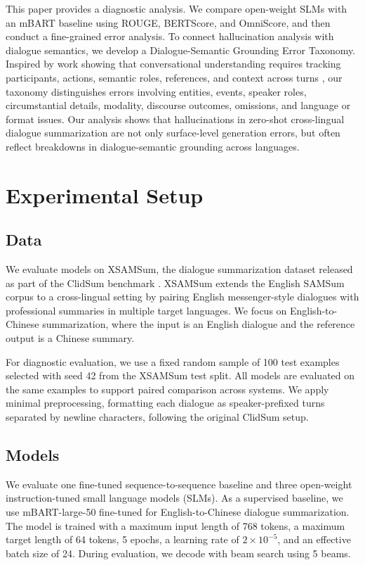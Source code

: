\documentclass[11pt]{article}
\begin{document}
This paper provides a diagnostic analysis. We compare open-weight SLMs with an mBART baseline using ROUGE, BERTScore, and OmniScore, and then conduct a fine-grained error analysis. To connect hallucination analysis with dialogue semantics, we develop a Dialogue-Semantic Grounding Error Taxonomy. Inspired by work showing that conversational understanding requires tracking participants, actions, semantic roles, references, and context across turns \citep{aghajanyan-etal-2020-conversational}, our taxonomy distinguishes errors involving entities, events, speaker roles, circumstantial details, modality, discourse outcomes, omissions, and language or format issues. Our analysis shows that hallucinations in zero-shot cross-lingual dialogue summarization are not only surface-level generation errors, but often reflect breakdowns in dialogue-semantic grounding across languages.

\section{Experimental Setup}
\subsection{Data}

We evaluate models on XSAMSum, the dialogue summarization dataset released as part of the ClidSum benchmark \citep{wang-etal-2022-clidsum}. XSAMSum extends the English SAMSum corpus \citep{gliwa-etal-2019-samsum} to a cross-lingual setting by pairing English messenger-style dialogues with professional summaries in multiple target languages. We focus on English-to-Chinese summarization, where the input is an English dialogue and the reference output is a Chinese summary.

For diagnostic evaluation, we use a fixed random sample of 100 test examples selected with seed 42 from the XSAMSum test split. All models are evaluated on the same examples to support paired comparison across systems. We apply minimal preprocessing, formatting each dialogue as speaker-prefixed turns separated by newline characters, following the original ClidSum setup.


\subsection{Models}

We evaluate one fine-tuned sequence-to-sequence baseline and three open-weight instruction-tuned small language models (SLMs). As a supervised baseline, we use mBART-large-50 fine-tuned for English-to-Chinese dialogue summarization. The model is trained with a maximum input length of 768 tokens, a maximum target length of 64 tokens, 5 epochs, a learning rate of $2\times10^{-5}$, and an effective batch size of 24. During evaluation, we decode with beam search using 5 beams.
\end{document}
